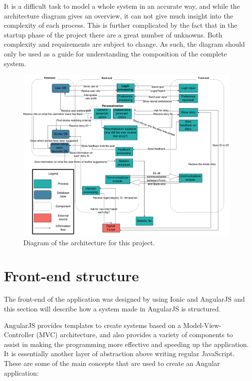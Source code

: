 It is a difficult task to model a whole system in an accurate way, and while the architecture diagram gives an overview, it can not give much insight into the complexity of each process. This is further complicated by the fact that in the startup phase of the project there are a great number of unknowns. Both complexity and requirements are subject to change. As such, the diagram should only be used as a guide for understanding the composition of the complete system.

\begin{figure}[h!]
	\begin{center}
		\advance\leftskip-3cm
		\advance\rightskip-3cm
		\includegraphics[keepaspectratio=true,scale=0.4]{fig/architecture}
		\caption{Diagram of the architecture for this project.}
		\label{Fig:architecture}
	\end{center}
\end{figure}

\section{Front-end structure}
\label{sec:frontend_structure}
The front-end of the application was designed by using Ionic and AngularJS and this section will describe how a system made in AngularJS is structured.\newline

AngularJS provides templates to create systems based on a Model-View-Controller (MVC) architecture, and also provides a variety of components to assist in making the programming more effective and speeding up the application. It is essentially another layer of abstraction above writing regular JavaScript. These are some of the main concepts that are used to create an Angular application:

